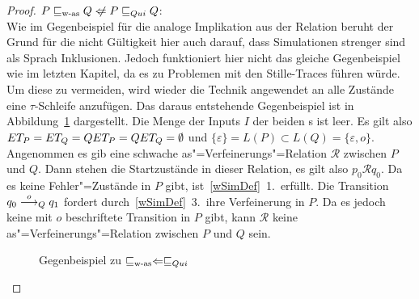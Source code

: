\begin{proof}
  $P \wasRel Q \hspace{0.1cm}\not\hspace{-0.1cm}\Leftarrow P \QRel Q$:\\
  Wie im Gegenbeispiel für die analoge Implikation aus der Relation \ERel{}
  beruht der Grund für die nicht Gültigkeit hier auch darauf, dass Simulationen
  strenger sind als Sprach Inklusionen. Jedoch funktioniert hier nicht das
  gleiche Gegenbeispiel wie im letzten Kapitel, da es zu Problemen mit den
  Stille-Traces führen würde. Um diese zu vermeiden, wird wieder die Technik
  angewendet an alle Zustände eine $\tau$-Schleife anzufügen. Das daraus
  entstehende Gegenbeispiel ist in Abbildung~\ref{WasQuiGegenBsp} dargestellt.
  Die Menge der Inputs $I$ der beiden \MEIO{}s ist leer. Es gilt also $ET _P =
  ET _Q = QET _P = QET _Q = \emptyset$ und $\{\varepsilon\} = L(P) \subset
  L(Q) = \{\varepsilon , o\}$.\\
  Angenommen es gib eine schwache as"=Verfeinerungs"=Relation $\mathcal{R}$
  zwischen $P$ und $Q$. Dann stehen die Startzustände in dieser Relation, es
  gilt also $p_0 \mathcal{R} q_0$. Da es keine Fehler"=Zustände in $P$ gibt,
  ist~\ref{wSimDef}~1.\ erfüllt. Die Transition $q_0 \must[o]_Q q_1$ fordert
  durch~\ref{wSimDef}~3.\ ihre Verfeinerung in $P$. Da es jedoch keine mit $o$
  beschriftete Transition in $P$ gibt, kann $\mathcal{R}$ keine
  as"=Verfeinerungs"=Relation zwischen $P$ und $Q$ sein.

  \begin{figure}[htbp]
    \begin{center}
      \caption{Gegenbeispiel zu $\sqsubseteq _{\mathrm{w}\text{-}\mathrm{as}} \Leftarrow  \sqsubseteq  _{Qui}$}
      \label{WasQuiGegenBsp}
    \end{center}
  \end{figure}


\end{proof}
